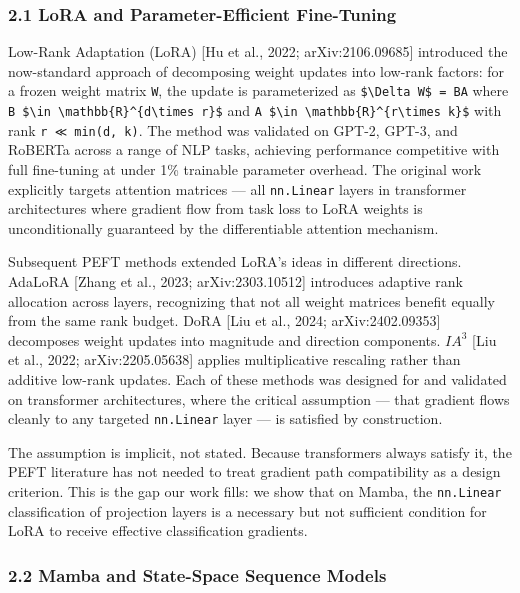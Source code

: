 
\subsubsection{2.1 LoRA and Parameter-Efficient Fine-Tuning}

Low-Rank Adaptation (LoRA) [Hu et al., 2022; arXiv:2106.09685] introduced the now-standard approach of decomposing weight updates into low-rank factors: for a frozen weight matrix \texttt{W}, the update is parameterized as \texttt{\$\textbackslash Delta W\$ = BA} where \texttt{B \$\textbackslash in \textbackslash mathbb\{R\}\^{}\{d\textbackslash times r\}\$} and \texttt{A \$\textbackslash in \textbackslash mathbb\{R\}\^{}\{r\textbackslash times k\}\$} with rank \texttt{r ≪ min(d, k)}. The method was validated on GPT-2, GPT-3, and RoBERTa across a range of NLP tasks, achieving performance competitive with full fine-tuning at under 1\% trainable parameter overhead. The original work explicitly targets attention matrices --- all \texttt{nn.Linear} layers in transformer architectures where gradient flow from task loss to LoRA weights is unconditionally guaranteed by the differentiable attention mechanism.

Subsequent PEFT methods extended LoRA's ideas in different directions. AdaLoRA [Zhang et al., 2023; arXiv:2303.10512] introduces adaptive rank allocation across layers, recognizing that not all weight matrices benefit equally from the same rank budget. DoRA [Liu et al., 2024; arXiv:2402.09353] decomposes weight updates into magnitude and direction components. $IA^3$ [Liu et al., 2022; arXiv:2205.05638] applies multiplicative rescaling rather than additive low-rank updates. Each of these methods was designed for and validated on transformer architectures, where the critical assumption --- that gradient flows cleanly to any targeted \texttt{nn.Linear} layer --- is satisfied by construction.

The assumption is implicit, not stated. Because transformers always satisfy it, the PEFT literature has not needed to treat gradient path compatibility as a design criterion. This is the gap our work fills: we show that on Mamba, the \texttt{nn.Linear} classification of projection layers is a necessary but not sufficient condition for LoRA to receive effective classification gradients.

\subsubsection{2.2 Mamba and State-Space Sequence Models}

